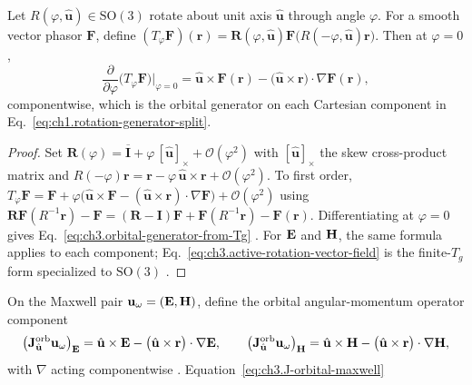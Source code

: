 \begin{proposition}
\label{prop:ch3.generator-from-finite-rotation}
Let $R(\varphi,\hat{\mathbf{u}})\in\mathrm{SO}(3)$ rotate about unit axis $\hat{\mathbf{u}}$ through angle $\varphi$.
For a smooth vector phasor $\mathbf{F}$, define $(T_\varphi\mathbf{F})(\mathbf{r})=\mathbf{R}(\varphi,\hat{\mathbf{u}})\mathbf{F}\!\big(R(-\varphi,\hat{\mathbf{u}})\mathbf{r}\big)$.
Then at $\varphi=0$,
\begin{equation}
\label{eq:ch3.orbital-generator-from-Tg}
\frac{\partial}{\partial\varphi}\big(T_\varphi\mathbf{F}\big)\Big|_{\varphi=0}
=
\hat{\mathbf{u}}\times\mathbf{F}(\mathbf{r})
-
\big(\hat{\mathbf{u}}\times\mathbf{r}\big)\cdot\nabla\mathbf{F}(\mathbf{r}),
\end{equation}
componentwise, which is the orbital generator on each Cartesian component in Eq.~\eqref{eq:ch1.rotation-generator-split}.
\end{proposition}
\begin{proof}
Set $\mathbf{R}(\varphi)=\overline{\mathbf{I}}+\varphi\,[\hat{\mathbf{u}}]_\times+\mathcal{O}(\varphi^2)$ with $[\hat{\mathbf{u}}]_\times$ the skew cross-product matrix and $R(-\varphi)\mathbf{r}=\mathbf{r}-\varphi\,\hat{\mathbf{u}}\times\mathbf{r}+\mathcal{O}(\varphi^2)$.
To first order,
$T_\varphi\mathbf{F}=\mathbf{F}+\varphi\big(\hat{\mathbf{u}}\times\mathbf{F}-(\hat{\mathbf{u}}\times\mathbf{r})\cdot\nabla\mathbf{F}\big)+\mathcal{O}(\varphi^2)$
using $\mathbf{R}\mathbf{F}(R^{-1}\mathbf{r})-\mathbf{F}=(\mathbf{R}-\mathbf{I})\mathbf{F}+\mathbf{F}(R^{-1}\mathbf{r})-\mathbf{F}(\mathbf{r})$.
Differentiating at $\varphi=0$ gives Eq.~\eqref{eq:ch3.orbital-generator-from-Tg} \cite{jackson1999}.
For $\mathbf{E}$ and $\mathbf{H}$, the same formula applies to each component; Eq.~\eqref{eq:ch3.active-rotation-vector-field} is the finite-$T_g$ form specialized to $\mathrm{SO}(3)$ \cite{stratton1941}.
\end{proof}
On the Maxwell pair
\(\mathbf{u}_\omega=(\mathbf{E},\mathbf{H})\), define the orbital angular-momentum operator component
\begin{equation}
\label{eq:ch3.J-orbital-maxwell}
\big(\mathbf{J}_{\hat{\mathbf{u}}}^{\mathrm{orb}}\mathbf{u}_\omega\big)_{\mathbf{E}}
=
\hat{\mathbf{u}}\times\mathbf{E}
-\big(\hat{\mathbf{u}}\times\mathbf{r}\big)\cdot\nabla\mathbf{E},
\qquad
\big(\mathbf{J}_{\hat{\mathbf{u}}}^{\mathrm{orb}}\mathbf{u}_\omega\big)_{\mathbf{H}}
=
\hat{\mathbf{u}}\times\mathbf{H}
-\big(\hat{\mathbf{u}}\times\mathbf{r}\big)\cdot\nabla\mathbf{H},
\end{equation}
with \(\nabla\) acting componentwise \cite{stratton1941}. Equation~\eqref{eq:ch3.J-orbital-maxwell}
